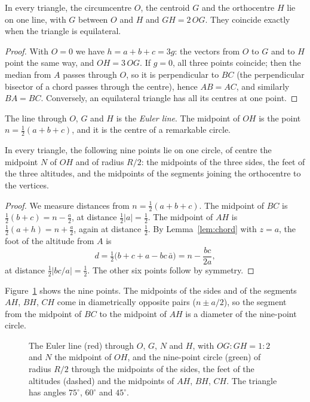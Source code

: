 \begin{theorem}[Euler, 1765]\label{thm:eulerline}
In every triangle, the circumcentre $O$, the centroid $G$ and the orthocentre $H$ lie on one line, with $G$ between $O$ and $H$ and
$GH=2\,OG$. They coincide exactly when the triangle is equilateral.
\end{theorem}
\begin{proof}
With $O=0$ we have $h=a+b+c=3g$: the vectors from $O$ to $G$ and to $H$ point the same way, and $OH=3\,OG$. If $g=0$, all three
points coincide; then the median from $A$ passes through $O$, so it is perpendicular to $BC$ (the perpendicular bisector of a chord
passes through the centre), hence $AB=AC$, and similarly $BA=BC$. Conversely, an equilateral triangle has all its centres at one point.
\end{proof}

The line through $O$, $G$ and $H$ is the \emph{Euler line}. The midpoint of $OH$ is the point $n=\frac12(a+b+c)$, and it is the centre
of a remarkable circle.

\begin{theorem}\label{thm:ninepoint}
In every triangle, the following nine points lie on one circle, of centre the midpoint $N$ of $OH$ and of radius $R/2$: the midpoints of
the three sides, the feet of the three altitudes, and the midpoints of the segments joining the orthocentre to the vertices.
\end{theorem}
\begin{proof}
We measure distances from $n=\frac12(a+b+c)$. The midpoint of $BC$ is $\frac12(b+c)=n-\frac a2$, at distance $\frac12|a|=\frac12$.
The midpoint of $AH$ is $\frac12(a+h)=n+\frac a2$, again at distance $\frac12$. By Lemma~\ref{lem:chord} with $z=a$, the foot of the
altitude from $A$ is
\[
d=\tfrac12\bigl(b+c+a-bc\,\bar a\bigr)=n-\frac{bc}{2a},
\]
at distance $\frac12|bc/a|=\frac12$. The other six points follow by symmetry.
\end{proof}

Figure~\ref{fig:euler} shows the nine points. The midpoints of the sides and of the segments $AH$, $BH$, $CH$ come in diametrically
opposite pairs ($n\pm a/2$), so the segment from the midpoint of $BC$ to the midpoint of $AH$ is a diameter of the nine-point circle.

\begin{figure}[ht]
\centering
{}
\caption{The Euler line (red) through $O$, $G$, $N$ and $H$, with $OG:GH=1:2$ and $N$ the midpoint of $OH$, and the nine-point circle
(green) of radius $R/2$ through the midpoints of the sides, the feet of the altitudes (dashed) and the midpoints of $AH$, $BH$, $CH$.
The triangle has angles $75^\circ$, $60^\circ$ and $45^\circ$.}
\label{fig:euler}
\end{figure}

